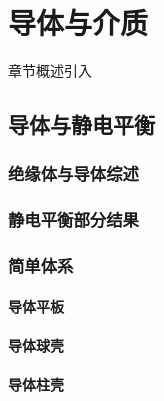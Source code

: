 \chapter{导体与介质}\label{1}

章节概述引入

\section{导体与静电平衡}\label{16-1}

\subsection{绝缘体与导体综述}\label{16-1-1}

\subsection{静电平衡部分结果}\label{16-1-2}

\subsection{简单体系}\label{16-1-3}

\subsubsection{导体平板}\label{16-1-3-1}

\subsubsection{导体球壳}\label{16-1-3-2}

\subsubsection{导体柱壳}\label{16-1-3-3}